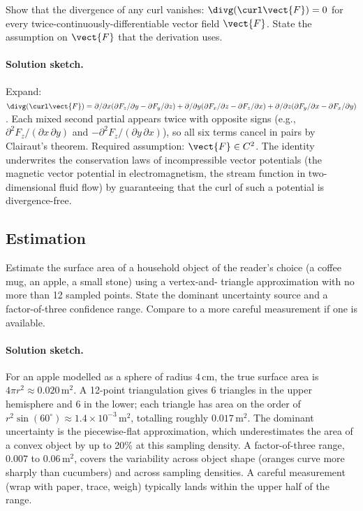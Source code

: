\begin{exercise}
Show that the divergence of any curl vanishes: $\divg(\curl\vect{F})
= 0$ for every twice-continuously-differentiable vector field
$\vect{F}$. State the assumption on $\vect{F}$ that the derivation
uses.

\paragraph{Solution sketch.} Expand:
$\divg(\curl\vect{F}) = \partial/\partial x(\partial F_{z}/\partial y
- \partial F_{y}/\partial z) + \partial/\partial y(\partial F_{x}/
\partial z - \partial F_{z}/\partial x) + \partial/\partial z(\partial
F_{y}/\partial x - \partial F_{x}/\partial y)$. Each mixed second
partial appears twice with opposite signs (e.g., $\partial^{2}
F_{z}/(\partial x\,\partial y)$ and $-\partial^{2} F_{z}/(\partial y
\,\partial x)$), so all six terms cancel in pairs by Clairaut's
theorem. Required assumption: $\vect{F} \in C^{2}$. The identity
underwrites the conservation laws of incompressible vector
potentials (the magnetic vector potential in electromagnetism, the
stream function in two-dimensional fluid flow) by guaranteeing that
the curl of such a potential is divergence-free.
\end{exercise}

\subsection*{Estimation}

\begin{exercise}
Estimate the surface area of a household object of the reader's
choice (a coffee mug, an apple, a small stone) using a vertex-and-
triangle approximation with no more than 12 sampled points. State
the dominant uncertainty source and a factor-of-three confidence
range. Compare to a more careful measurement if one is available.

\paragraph{Solution sketch.} For an apple modelled as a sphere of
radius $4\,\si{\centi\meter}$, the true surface area is $4\pi r^{2}
\approx 0.020\,\si{\meter\squared}$. A 12-point triangulation gives
6 triangles in the upper hemisphere and 6 in the lower; each
triangle has area on the order of $r^{2}\sin(60^{\circ}) \approx
1.4\times 10^{-3}\,\si{\meter\squared}$, totalling roughly $0.017\,
\si{\meter\squared}$. The dominant uncertainty is the
piecewise-flat approximation, which underestimates the area of a
convex object by up to 20\% at this sampling density. A
factor-of-three range, $0.007$ to $0.06\,\si{\meter\squared}$,
covers the variability across object shape (oranges curve more
sharply than cucumbers) and across sampling densities. A careful
measurement (wrap with paper, trace, weigh) typically lands within
the upper half of the range.
\end{exercise}


